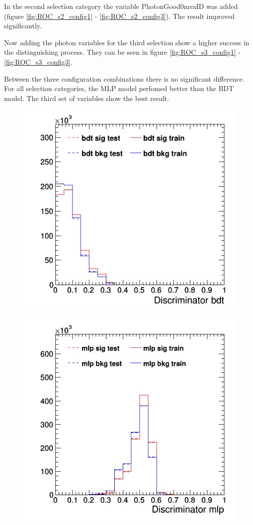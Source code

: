 \documentclass[11pt]{scrartcl}
\begin{document}
		In the second selection category the variable PhotonGood0mvaID was added (figure \ref{fig:ROC_s2_config1} - \ref{fig:ROC_s2_config3}). The result improved significantly.
		
		Now adding the photon variables for the third selection show a higher success in the distinguishing process. They can be seen in figure \ref{fig:ROC_s3_config1} - \ref{fig:ROC_s3_config3}. 
		
		Between the three configuration combinations there is no significant difference. For all selection categories, the MLP model perfomed better than the BDT model. The third set of variables show the best result.
				
	\begin{figure}[H]
	\centering
	\begin{minipage}{.5\textwidth}
	  \centering
	  \includegraphics[width=0.75\linewidth]{figures/MVA/select1/config1/discriminator_bdt.png}
	  \label{fig:distr_s1_config1_bdt}
	\end{minipage}%
	\begin{minipage}{.5\textwidth}
	  \centering
	  \includegraphics[width=0.75\linewidth]{figures/MVA/select1/config1/discriminator_mlp.png}

\end{minipage}
\end{figure}
\end{document}
